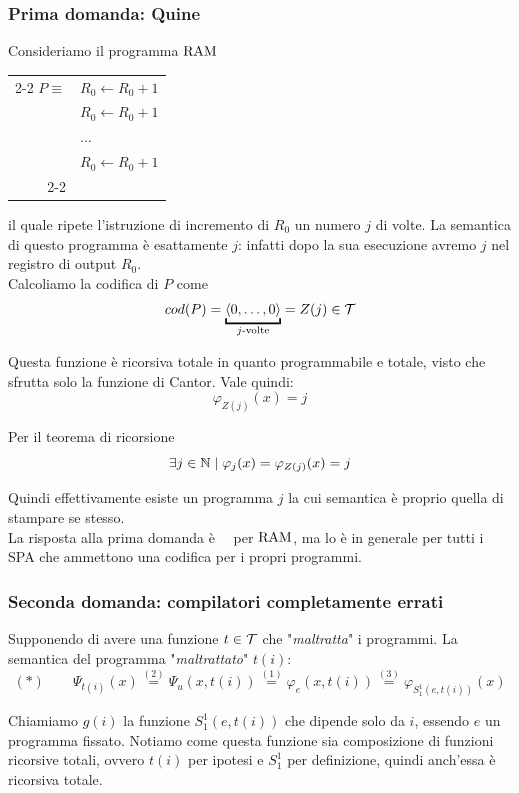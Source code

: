 \subsubsection{Prima domanda: Quine}
Consideriamo il programma $\text{RAM}$
\begin{center}
	\begin{tabular}{r|l|}
		\cline{2-2}
		$P \equiv$ & $R_0 \leftarrow R_0 + 1$ \\
		& $R_0 \leftarrow R_0 + 1$ \\
		& $\dots$ \\
		& $R_0 \leftarrow R_0 + 1$ \\
		\cline{2-2}
	\end{tabular}
\end{center}
il quale ripete l'istruzione di incremento di $R_0$ un numero $j$ di volte. La semantica di questo programma è esattamente $j$: infatti dopo la sua esecuzione avremo $j$ nel registro di output $R_0$. \\

Calcoliamo la codifica di $P$ come
$$ cod(P) = \underbracket{\langle 0, \dots, 0 \rangle}_{j\text{-volte}} = Z (j) \in \T $$

Questa funzione è ricorsiva totale in quanto programmabile e totale, visto che sfrutta solo la funzione di Cantor. Vale quindi:
$$ \varphi_{Z(j)} (x) = j $$

Per il teorema di ricorsione
$$ \exists j \in \mathbb{N} \mid \varphi_j (x) = \varphi_{Z (j)} (x) = j $$

Quindi effettivamente esiste un programma $j$ la cui semantica è proprio quella di stampare se stesso.\\

La risposta alla prima domanda è \si\ per $\text{RAM}$, ma lo è in generale per tutti i SPA che ammettono una codifica per i propri programmi.\\

\subsubsection{Seconda domanda: compilatori completamente errati}

Supponendo di avere una funzione $t \in \mathcal{T}$ che "\textit{maltratta}" i programmi. La semantica del programma "\textit{maltrattato}" $t(i)$:
$$ (\ast) \quad \quad \Psi_{t(i)} (x) \stackrel{(2)}{=} \Psi_u (x, t(i)) \stackrel{(1)}{=} \varphi_e (x, t(i)) \stackrel{(3)}{=} \varphi_{S_1^1 (e,t(i))} (x) $$

Chiamiamo $g(i)$ la funzione $S_1^1 (e, t(i))$ che dipende solo da $i$, essendo $e$ un programma fissato. Notiamo come questa funzione sia composizione di funzioni ricorsive totali, ovvero $t(i)$ per ipotesi e $S^1_1$ per definizione, quindi anch'essa è ricorsiva totale. \\

